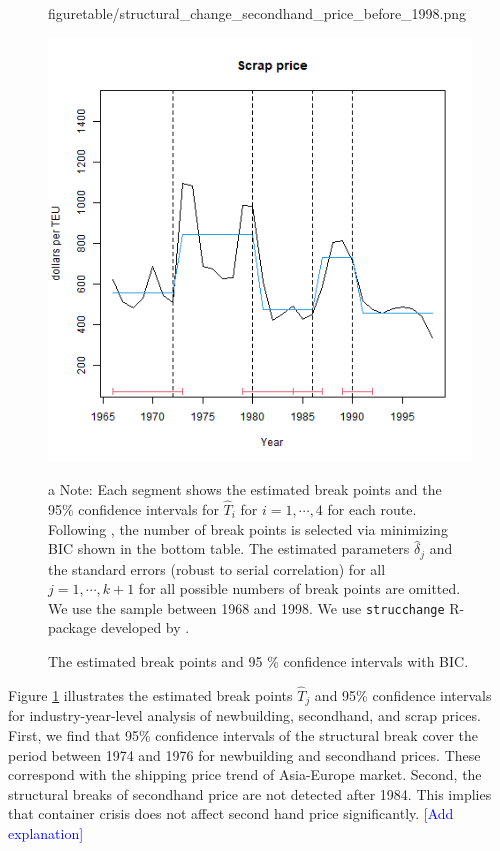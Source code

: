 \documentclass[11pt]{article}
\begin{document}
\begin{figure}[!ht]
\begin{minipage}[b]{0.3\linewidth}
  {figuretable/structural_change_secondhand_price_before_1998.png}
  \end{minipage}
  \begin{minipage}[b]{0.3\linewidth}
  \includegraphics[keepaspectratio, scale=0.31]
  {figuretable/structural_change_scrap_price_before_1998.png}
  \end{minipage}
  {\scriptsize{}
  
\caption{The estimated break points and 95 \% confidence intervals with BIC.}
\label{fg:structural_change_scrap_price_before_1998}
\begin{tablenotes}
\item[a]Note: Each segment shows the estimated break points and the 95\% confidence intervals for $\hat{T}_i$ for $i=1,\cdots,4$ for each route. Following \cite{bai2003computation}, the number of break points is selected via minimizing BIC shown in the bottom table. The estimated parameters $\hat{\delta}_j$ and the standard errors (robust to serial correlation) for all $j=1,\cdots,k+1$ for all possible numbers of break points are omitted. We use the sample between 1968 and 1998. We use \texttt{strucchange} R-package developed by \cite{zeileis2002strucchange}. 
   \end{tablenotes}
   }
\end{figure}


Figure \ref{fg:structural_change_scrap_price_before_1998} illustrates the estimated break points $\hat{T}_j$ and 95\% confidence intervals for industry-year-level analysis of newbuilding, secondhand, and scrap prices. First, we find that 95\% confidence intervals of the structural break cover the period between 1974 and 1976 for newbuilding and secondhand prices. These correspond with the shipping price trend of Asia-Europe market. Second, the structural breaks of secondhand price are not detected after 1984. This implies that container crisis does not affect second hand price significantly. \textcolor{blue}{[Add explanation]}
\end{document}

